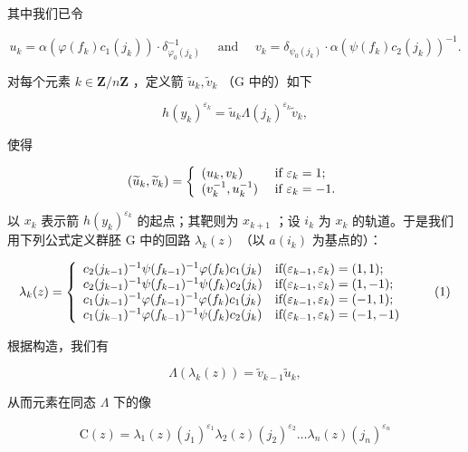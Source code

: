 其中我们已令

\[
u _ {k} = \alpha (\varphi (f _ {k}) c _ {1} (j _ {k})) \cdot \delta_ {\varphi_ {0} (j _ {k})} ^ {- 1} \quad \text { and } \quad v _ {k} = \delta_ {\psi_ {0} (j _ {k})} \cdot \alpha (\psi (f _ {k}) c _ {2} (j _ {k})) ^ {- 1}.
\]

对每个元素 \(k \in \mathbf{Z}/n\mathbf{Z}\) ，定义箭 \(\widetilde{u}_{k}, \widetilde{v}_{k}\) （G 中的）如下

\[
h (y _ {k}) ^ {\varepsilon_ {k}} = \widetilde {u} _ {k} \Lambda (j _ {k}) ^ {\varepsilon_ {k}} \widetilde {v} _ {k},
\]

使得

\[
(\widetilde {u} _ {k}, \widetilde {v} _ {k}) = \left\{ \begin{array}{l l} (u _ {k}, v _ {k}) & \text { if } \varepsilon_ {k} = 1; \\ (v _ {k} ^ {- 1}, u _ {k} ^ {- 1}) & \text { if } \varepsilon_ {k} = - 1. \end{array} \right.
\]

以 \(x_{k}\) 表示箭 \(h(y_{k})^{\varepsilon_{k}}\) 的起点；其靶则为 \(x_{k+1}\) ；设 \(i_{k}\) 为 \(x_{k}\) 的轨道。于是我们用下列公式定义群胚 G 中的回路 \(\lambda_{k}(z)\) （以 \(a(i_{k})\) 为基点的）：

\[
\lambda_ {k} (z) = \left\{ \begin{array}{l l} c _ {2} (j _ {k - 1}) ^ {- 1} \psi (f _ {k - 1}) ^ {- 1} \varphi (f _ {k}) c _ {1} (j _ {k}) & \text {if} (\varepsilon_ {k - 1}, \varepsilon_ {k}) = (1, 1); \\ c _ {2} (j _ {k - 1}) ^ {- 1} \psi (f _ {k - 1}) ^ {- 1} \psi (f _ {k}) c _ {2} (j _ {k}) & \text {if} (\varepsilon_ {k - 1}, \varepsilon_ {k}) = (1, - 1); \\ c _ {1} (j _ {k - 1}) ^ {- 1} \varphi (f _ {k - 1}) ^ {- 1} \varphi (f _ {k}) c _ {1} (j _ {k}) & \text {if} (\varepsilon_ {k - 1}, \varepsilon_ {k}) = (- 1, 1); \\ c _ {1} (j _ {k - 1}) ^ {- 1} \varphi (f _ {k - 1}) ^ {- 1} \psi (f _ {k}) c _ {2} (j _ {k}) & \text {if} (\varepsilon_ {k - 1}, \varepsilon_ {k}) = (- 1, - 1) \end{array} \right.\tag{1}
\]

根据构造，我们有

\[
\Lambda (\lambda_ {k} (z)) = \widetilde {v} _ {k - 1} \widetilde {u} _ {k},
\]

从而元素在同态 \(\Lambda\) 下的像

\[
\mathrm{C} (z) = \lambda_ {1} (z) (j _ {1}) ^ {\varepsilon_ {1}} \lambda_ {2} (z) (j _ {2}) ^ {\varepsilon_ {2}} \dots \lambda_ {n} (z) (j _ {n}) ^ {\varepsilon_ {n}}\tag{2}
\]

